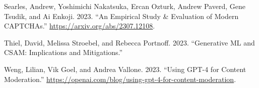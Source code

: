 \documentclass[
  10pt,
  ignorenonframetext,
]{beamer}
\newlength{\cslhangindent}
\newenvironment{CSLReferences}[2] %
 {\begin{list}{}{%
  \setlength{\itemindent}{0pt}
  \setlength{\leftmargin}{0pt}
  \setlength{\parsep}{0pt}
  \ifodd #1
   \setlength{\leftmargin}{\cslhangindent}
   \setlength{\itemindent}{-1\cslhangindent}
  \fi
  \setlength{\itemsep}{#2\baselineskip}}}
 {\end{list}}
\begin{document}
\begin{frame}{}
\begin{CSLReferences}{1}{0}
Searles, Andrew, Yoshimichi Nakatsuka, Ercan Ozturk, Andrew Paverd, Gene
Tsudik, and Ai Enkoji. 2023. {``An Empirical Study \& Evaluation of
Modern CAPTCHAs.''} \url{https://arxiv.org/abs/2307.12108}.

Thiel, David, Melissa Stroebel, and Rebecca Portnoff. 2023.
{``Generative ML and CSAM: Implications and Mitigations.''}

Weng, Lilian, Vik Goel, and Andrea Vallone. 2023. {``Using GPT-4 for
Content Moderation.''}
\url{https://openai.com/blog/using-gpt-4-for-content-moderation}.

\end{CSLReferences}
\end{frame}
\end{document}
